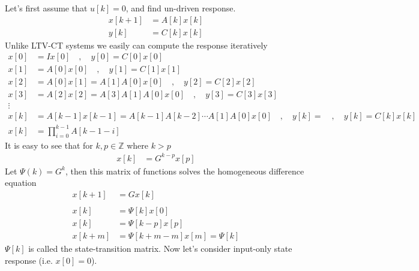 \documentclass[twoside]{article}
\begin{document}
Let's first assume that $u[k] = 0$, and find un-driven 
response.
%
\begin{align*}
  x[k+1] &= A[k] x[k] \\ y[k] &= C[k] x[k]
\end{align*}
%
Unlike LTV-CT systems we easily can compute the response iteratively
%
\begin{align*}
   x[0] &= I x[0] \quad , \quad y[0] = C[0] x[0]
   \\
  x[1] &= A[0] x[0] \quad , \quad y[1] = C[1] x[1]
  \\
  x[2] &= A[0] x[1] = A[1] A[0] x[0] \quad , \quad y[2] = C[2] x[2]
  \\
  x[3] &= A[2] x[2] = A[3] A[1] A[0] x[0] \quad , \quad y[3] = C[3] x[3]
  \\
  \vdots
  \\
  x[k] &= A[k-1] x[k-1] = A[k-1] A[k-2] \cdots A[1] A[0] x[0]  \quad , \quad y[k] = \quad , \quad y[k] = C[k] x[k]
  \\
  x[k] &= \prod_{i=0}^{k-1} A[k-1-i] 
\end{align*}
%
It is easy to see that for $k , p \in \mathbb{Z}$ where $k > p$
%
\begin{align*}
  x[k] &= G^{k-p} x[p] 
\end{align*}
%
Let $\Psi(k) = G^k$, then this matrix of functions solves the
homogeneous difference equation
%
\begin{align*}
  x[k+1] &= G x[k] 
\\    
\\
  x[k] &=\Psi[k] x[0] 
\\
  x[k] &=\Psi[k-p] x[p] 
\\
 x[k+m] &=\Psi[ k + m - m] x[m] = \Psi[k]
\end{align*}
%
$\Psi[k]$ is called the state-transition matrix.
%
Now let's consider input-only state response (i.e. $x[0] = 0$).
%
\end{document}

